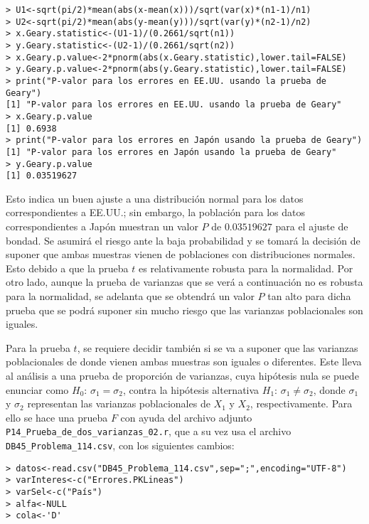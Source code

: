 \begin{solucion}
\begin{verbatim}
> U1<-sqrt(pi/2)*mean(abs(x-mean(x)))/sqrt(var(x)*(n1-1)/n1)
> U2<-sqrt(pi/2)*mean(abs(y-mean(y)))/sqrt(var(y)*(n2-1)/n2)
> x.Geary.statistic<-(U1-1)/(0.2661/sqrt(n1))
> y.Geary.statistic<-(U2-1)/(0.2661/sqrt(n2))
> x.Geary.p.value<-2*pnorm(abs(x.Geary.statistic),lower.tail=FALSE)
> y.Geary.p.value<-2*pnorm(abs(y.Geary.statistic),lower.tail=FALSE)
> print("P-valor para los errores en EE.UU. usando la prueba de Geary")
[1] "P-valor para los errores en EE.UU. usando la prueba de Geary"
> x.Geary.p.value
[1] 0.6938
> print("P-valor para los errores en Japón usando la prueba de Geary")
[1] "P-valor para los errores en Japón usando la prueba de Geary"
> y.Geary.p.value
[1] 0.03519627
 \end{verbatim}
 \vspace{-0.5cm}
 Esto indica un buen ajuste a una distribuci\'on normal
 para los datos correspondientes a EE.UU.;
 sin embargo, la poblaci\'on para los datos correspondientes a Jap\'on
 muestran un valor $P$ de $0.03519627$ para el ajuste de bondad.
 Se asumir\'a el riesgo ante la baja probabilidad
 y se tomar\'a la decisi\'on de suponer que ambas muestras vienen
 de poblaciones con distribuciones normales.
 Esto debido a que la prueba $t$ es relativamente robusta
 para la normalidad.
 Por otro lado, aunque la prueba de varianzas que se ver\'a
 a continuaci\'on no es robusta para la normalidad,
 se adelanta que se obtendr\'a un valor $P$ tan alto para dicha prueba
 que se podr\'a suponer sin mucho riesgo que las varianzas poblacionales
 son iguales.
 \par
 Para la prueba $t$, se requiere decidir tambi\'en si se va a suponer
 que las varianzas poblacionales de donde vienen ambas muestras
 son iguales o diferentes.
 Este lleva al an\'alisis a una prueba de proporci\'on de varianzas,
 cuya hip\'otesis nula se puede enunciar como
 $H_0: \, \sigma_1 = \sigma_2$, contra la hip\'otesis alternativa
 $H_1: \, \sigma_1 \neq \sigma_2$, donde $\sigma_1$ y $\sigma_2$
 representan las varianzas poblacionales de $X_1$ y $X_2$,
 respectivamente.
 Para ello se hace una prueba $F$ con ayuda del archivo adjunto
 \texttt{P14\_Prueba\_de\_dos\_varianzas\_02.r},
 que a su vez usa el archivo \texttt{DB45\_Problema\_114.csv},
 con los siguientes cambios:
 \begin{verbatim}
> datos<-read.csv("DB45_Problema_114.csv",sep=";",encoding="UTF-8")
> varInteres<-c("Errores.PKLineas")
> varSel<-c("País")
> alfa<-NULL
> cola<-'D'
 \end{verbatim}
 \vspace{-0.5cm}

\end{solucion}
